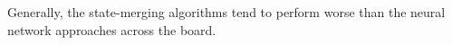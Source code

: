 \documentclass[twoside,11pt]{article}
\begin{document}
Generally, the state-merging algorithms tend to perform worse than the neural network approaches across the board.
\end{document}
